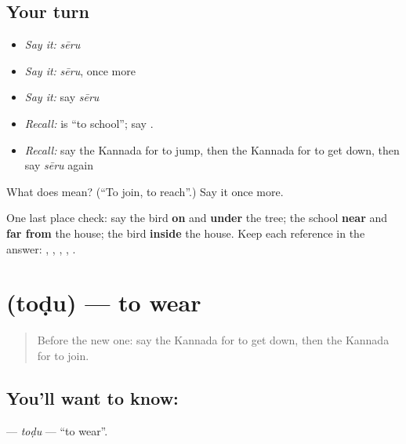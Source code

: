 \subsection*{Your turn}
\begin{itemize}
\raggedright
  \item \emph{Say it:} \emph{sēru}
  \item \emph{Say it:} \emph{sēru}, once more
  \item \emph{Say it:} say \emph{sēru}
  \item \emph{Recall:} \textbf{} is “to school”; say \textbf{  }.
  \item \emph{Recall:} say the Kannada for to jump, then the Kannada for to get down, then say \emph{sēru} again
\end{itemize}

\begin{tcolorbox}[breakable,colback=teal!4,colframe=teal!35!black,title={Before you move on}]
What does  mean? (\textquotedblleft{}To join, to reach\textquotedblright{}.) Say it once more.
\end{tcolorbox}

\begin{tcolorbox}[breakable,colback=teal!4,colframe=teal!35!black,title={Before you move on}]
One last place check: say the bird \textbf{on} and \textbf{under} the tree; the school \textbf{near} and \textbf{far from} the house; the bird \textbf{inside} the house. Keep each reference in the answer: \textbf{ }, \textbf{ }, \textbf{ }, \textbf{ }, \textbf{}.
\end{tcolorbox}
\section[\texorpdfstring{\kn{ತೊಡು} (toḍu)}{ತೊಡು (toḍu)}]{ (toḍu) — to wear}

\label{lesson:KA-C149-todu}



\begin{quote}
Before the new one: say the Kannada for to get down, then the Kannada for to join.
\end{quote}

\subsection*{You'll want to know: }
\textbf{} — \emph{toḍu} — \textquotedblleft{}to wear\textquotedblright{}.

